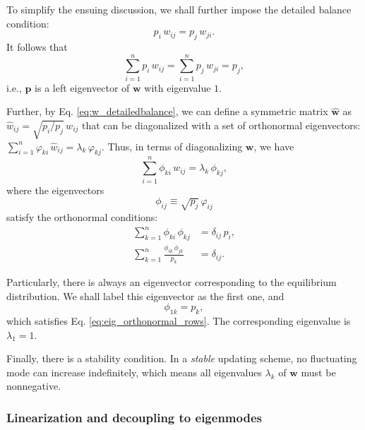 \documentclass[reprint, floatfix]{revtex4-1}
\begin{document}
To simplify the ensuing discussion,
we shall further impose the
detailed balance condition:
%
\begin{equation}
  p_i \, w_{ij} = p_j \, w_{ji}.
  \label{eq:w_detailedbalance}
\end{equation}
%
It follows that
\begin{equation}
  \sum_{i = 1}^n p_i \, w_{ij}
  =
  \sum_{i = 1}^n p_j \, w_{ji}
  = p_j,
  \label{eq:w_balance}
\end{equation}
%
i.e., $\mathbf p$ is a left eigenvector of
$\mathbf w$ with eigenvalue $1$.



Further, by Eq. \eqref{eq:w_detailedbalance},
we can define a symmetric matrix $\hat{\mathbf w}$
as $\hat w_{ij} = \sqrt{p_i/p_j} \, w_{ij}$
that can be diagonalized\cite{vankampen}
with a set of orthonormal eigenvectors:
%
$\sum_{i = 1}^n \varphi_{ki} \, \hat w_{ij} = \lambda_k \, \varphi_{kj}$.
%
Thus,
in terms of diagonalizing $\mathbf w$, we have
\begin{equation}
  \sum_{i = 1}^n \phi_{ki} \, w_{ij} = \lambda_k \, \phi_{kj},
  \label{eq:eig_w}
\end{equation}
where the eigenvectors
$$\phi_{ij} \equiv \sqrt{p_j} \, \varphi_{ij}$$
satisfy the orthonormal conditions\cite{vankampen}:
%
\begin{align}
\sum_{k = 1}^n \phi_{ki} \, \phi_{kj}
&= \delta_{ij} \, p_i,
\label{eq:eig_orthonormal_cols}
\\
\sum_{k = 1}^n \frac{ \phi_{ik} \, \phi_{jk} }{ p_k }
&= \delta_{ij}.
\label{eq:eig_orthonormal_rows}
\end{align}


Particularly, there is always an eigenvector
corresponding to the equilibrium distribution.
%
We shall label this eigenvector as the first one,
and
%
\begin{equation}
\phi_{1k} = p_k,
\label{eq:eigenmode1}
\end{equation}
%
which satisfies Eq. \eqref{eq:eig_orthonormal_rows}.
%
The corresponding eigenvalue is $\lambda_1 = 1$.

Finally, there is a stability condition.
%
In a \emph{stable} updating scheme,
no fluctuating mode can increase indefinitely,
which means all eigenvalues $\lambda_k$ of $\mathbf w$
must be nonnegative.




\subsubsection{Linearization and decoupling to eigenmodes}
\end{document}
